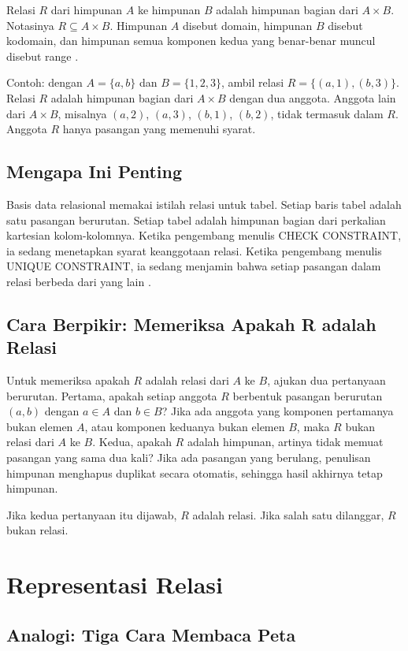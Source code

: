 \documentclass[11pt,a4paper]{article}
\begin{document}
Relasi $R$ dari himpunan $A$ ke himpunan $B$ adalah himpunan bagian dari $A \times B$. Notasinya $R \subseteq A \times B$. Himpunan $A$ disebut domain, himpunan $B$ disebut kodomain, dan himpunan semua komponen kedua yang benar-benar muncul disebut range \cite{rosen}.

Contoh: dengan $A=\{a,b\}$ dan $B=\{1,2,3\}$, ambil relasi $R=\{(a,1),(b,3)\}$. Relasi $R$ adalah himpunan bagian dari $A \times B$ dengan dua anggota. Anggota lain dari $A \times B$, misalnya $(a,2)$, $(a,3)$, $(b,1)$, $(b,2)$, tidak termasuk dalam $R$. Anggota $R$ hanya pasangan yang memenuhi syarat.

\subsection{Mengapa Ini Penting}

Basis data relasional memakai istilah relasi untuk tabel. Setiap baris tabel adalah satu pasangan berurutan. Setiap tabel adalah himpunan bagian dari perkalian kartesian kolom-kolomnya. Ketika pengembang menulis CHECK CONSTRAINT, ia sedang menetapkan syarat keanggotaan relasi. Ketika pengembang menulis UNIQUE CONSTRAINT, ia sedang menjamin bahwa setiap pasangan dalam relasi berbeda dari yang lain \cite{date}.

\subsection{Cara Berpikir: Memeriksa Apakah R adalah Relasi}

Untuk memeriksa apakah $R$ adalah relasi dari $A$ ke $B$, ajukan dua pertanyaan berurutan. Pertama, apakah setiap anggota $R$ berbentuk pasangan berurutan $(a,b)$ dengan $a \in A$ dan $b \in B$? Jika ada anggota yang komponen pertamanya bukan elemen $A$, atau komponen keduanya bukan elemen $B$, maka $R$ bukan relasi dari $A$ ke $B$. Kedua, apakah $R$ adalah himpunan, artinya tidak memuat pasangan yang sama dua kali? Jika ada pasangan yang berulang, penulisan himpunan menghapus duplikat secara otomatis, sehingga hasil akhirnya tetap himpunan.

Jika kedua pertanyaan itu dijawab, $R$ adalah relasi. Jika salah satu dilanggar, $R$ bukan relasi.

\section{Representasi Relasi}

\subsection{Analogi: Tiga Cara Membaca Peta}
\end{document}
